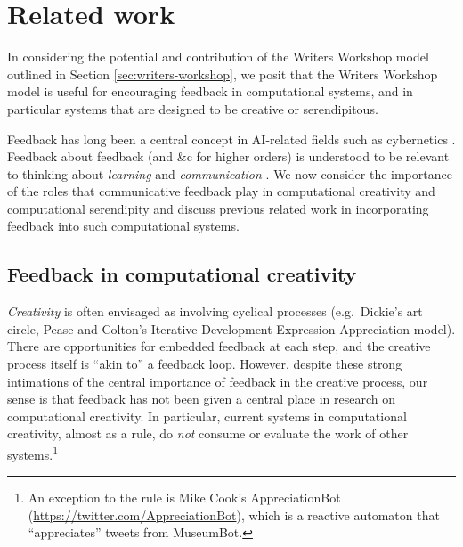 \section{Related work}\label{sec:ww-related}


In considering the potential and contribution of the Writers Workshop model outlined in Section \ref{sec:writers-workshop}, we posit that the Writers Workshop model is useful for encouraging feedback in computational systems, and in particular systems that are designed to be creative or serendipitous. 

Feedback has long been a central concept in AI-related fields such as cybernetics \cite{ashby1956,seth2015cybernetic}. Feedback about feedback (and \&c for higher orders) is understood to be
relevant to thinking about \emph{learning} and \emph{communication}
\cite{bateson+steps+2000}. We now consider the importance of the roles that communicative feedback play in computational creativity and computational serendipity and discuss previous related work in incorporating feedback into such computational systems.



\subsection{Feedback in computational creativity} \label{ref:related-computational-creativity}

\emph{Creativity} is often envisaged as involving cyclical processes
(e.g.~Dickie's \citeyear{dickie1984art} art circle, Pease and Colton's
\citeyear{pease2011computational} Iterative
Development-Expression-Appreciation model).  There are opportunities
for embedded feedback at each step, and the creative process itself is ``akin
to'' a feedback loop.  However, despite these strong intimations of
the central importance of feedback in the creative process, our sense
is that feedback has not been given a central place in research on
computational creativity.  In particular, current systems in
computational creativity, almost as a rule, do \emph{not} consume or
evaluate the work of other systems.\footnote{An exception to
  the rule is Mike Cook's {\sf AppreciationBot}
  (\url{https://twitter.com/AppreciationBot}), which is a reactive
  automaton that ``appreciates'' tweets from {\sf MuseumBot}.}

